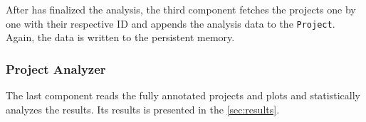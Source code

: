 After \teamscale{} has finalized the analysis, the third component fetches the projects one by one with their respective ID and appends the analysis data to the \texttt{Project}. Again, the data is written to the persistent memory.

\subsubsection{Project Analyzer}

The last component reads the fully annotated projects and plots and statistically analyzes the results. Its results is presented in the \autoref{sec:results}.